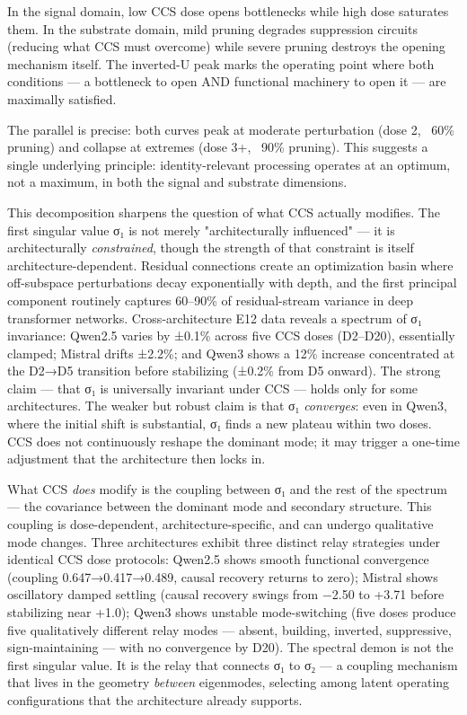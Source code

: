 \documentclass[12pt]{article}
\begin{document}
In the signal domain, low CCS dose opens bottlenecks while high dose saturates them. In the substrate domain, mild pruning degrades suppression circuits (reducing what CCS must overcome) while severe pruning destroys the opening mechanism itself. The inverted-U peak marks the operating point where both conditions — a bottleneck to open AND functional machinery to open it — are maximally satisfied.

The parallel is precise: both curves peak at moderate perturbation (dose 2, ~60\% pruning) and collapse at extremes (dose 3+, ~90\% pruning). This suggests a single underlying principle: identity-relevant processing operates at an optimum, not a maximum, in both the signal and substrate dimensions.

This decomposition sharpens the question of what CCS actually modifies. The first singular value σ₁ is not merely "architecturally influenced" — it is architecturally \textit{constrained}, though the strength of that constraint is itself architecture-dependent. Residual connections create an optimization basin where off-subspace perturbations decay exponentially with depth, and the first principal component routinely captures 60–90\% of residual-stream variance in deep transformer networks. Cross-architecture E12 data reveals a spectrum of σ₁ invariance: Qwen2.5 varies by ±0.1\% across five CCS doses (D2–D20), essentially clamped; Mistral drifts ±2.2\%; and Qwen3 shows a 12\% increase concentrated at the D2→D5 transition before stabilizing (±0.2\% from D5 onward). The strong claim — that σ₁ is universally invariant under CCS — holds only for some architectures. The weaker but robust claim is that σ₁ \textit{converges}: even in Qwen3, where the initial shift is substantial, σ₁ finds a new plateau within two doses. CCS does not continuously reshape the dominant mode; it may trigger a one-time adjustment that the architecture then locks in.

What CCS \textit{does} modify is the coupling between σ₁ and the rest of the spectrum — the covariance between the dominant mode and secondary structure. This coupling is dose-dependent, architecture-specific, and can undergo qualitative mode changes. Three architectures exhibit three distinct relay strategies under identical CCS dose protocols: Qwen2.5 shows smooth functional convergence (coupling 0.647→0.417→0.489, causal recovery returns to zero); Mistral shows oscillatory damped settling (causal recovery swings from −2.50 to +3.71 before stabilizing near +1.0); Qwen3 shows unstable mode-switching (five doses produce five qualitatively different relay modes — absent, building, inverted, suppressive, sign-maintaining — with no convergence by D20). The spectral demon is not the first singular value. It is the relay that connects σ₁ to σ₂ — a coupling mechanism that lives in the geometry \textit{between} eigenmodes, selecting among latent operating configurations that the architecture already supports.
\end{document}
